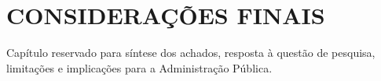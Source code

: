 \chapter{CONSIDERAÇÕES FINAIS}

Capítulo reservado para síntese dos achados, resposta à questão de pesquisa, limitações e implicações para a Administração Pública.
